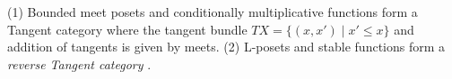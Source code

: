 \begin{conjecture}
  \label{con:tangent-stable-fns}
  (1) Bounded meet posets and conditionally multiplicative functions
  form a Tangent category where the tangent bundle
  $TX = \{(x,x') \mid x' \leq x\}$ and addition of tangents is given
  by meets. (2) L-posets and stable functions form a \emph{reverse
    Tangent category} \cite{reverse-tangents}.
\end{conjecture}




